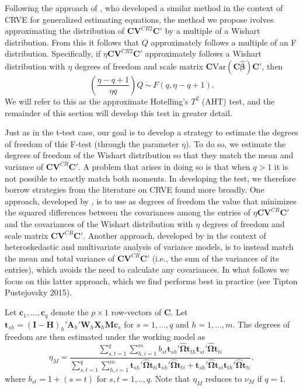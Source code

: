 \documentclass[12pt]{article}
\newcommand{\Var}{\text{Var}}
\newcommand{\bm}{\mathbf}
\newcommand{\bs}{\boldsymbol}
\begin{document}
Following the approach of \cite{Pan2002small}, who developed a similar method in the context of CRVE for generalized estimating equations, the method we propose ivolves approximating the distribution of $\bm{C}\bm{V}^{CR2} \bm{C}'$ by a multiple of a Wishart distribution. From this it follows that $Q$ approximately follows a multiple of an F distribution. Specifically, if $\eta \bm{C}\bm{V}^{CR2} \bm{C}'$ approximately follows a Wishart distribution with $\eta$ degrees of freedom and scale matrix $\bm{C} \Var\left(\bm{C}\bs{\hat\beta}\right)\bm{C}'$, then 
\begin{equation}
\label{eq:AHT}
\left(\frac{\eta - q + 1}{\eta q}\right) Q \ \dot\sim \ F(q, \eta - q + 1).
\end{equation}
We will refer to this as the approximate Hotelling's $T^2$ (AHT) test, and the remainder of this section will develop this test in greater detail.

Just as in the t-test case, our goal is to develop a strategy to estimate the degrees of freedom of this F-test (through the parameter $\eta$). 
To do so, we estimate the degrees of freedom of the Wishart distribution so that they match the mean and variance of $\bm{C}\bm{V}^{CR} \bm{C}'$. 
A problem that arises in doing so is that when $q > 1$ it is not possible to exactly match both moments. 
In developing the test, we therefore borrow strategies from the literature on CRVE found more broadly. 
One approach, developed by \cite{Pan2002small}, is to use as degrees of freedom the value that minimizes the squared differences between the covariances among the entries of $\eta \bm{C}\bm{V}^{CR}\bm{C}'$ and the covariances of the Wishart distribution with $\eta$ degrees of freedom and scale matrix $\bm{C}\bm{V}^{CR}\bm{C}'$. Another approach, developed by \citet{Zhang2012two-wayANOVA, Zhang2012MANOVA, Zhang2013tests} in the context of heteroskedastic and multivariate analysis of variance models, is to instead match the mean and total variance of $\bm{C}\bm{V}^{CR}\bm{C}'$ (i.e., the sum of the variances of its entries), which avoids the need to calculate any covariances. In what follows we focus on this latter approach, which we find performs best in practice (see Tipton Pustejovsky 2015).

Let $\bm{c}_1,...,\bm{c}_q$ denote the $p \times 1$ row-vectors of $\bm{C}$. 
Let $\bm{t}_{sh} = \left(\bm{I} - \bm{H}\right)_h'\bm{A}_h'\bm{W}_h\bm{X}_h\bm{M}\bm{c}_s$ for $s = 1,...,q$ and $h = 1,...,m$. 
The degrees of freedom are then estimated under the working model as
\begin{equation}
\label{eq:eta_model}
\eta_M = \frac{\sum_{s,t=1}^q \sum_{h,i=1}^m b_{st} \bm{t}_{sh}'\hat{\bs\Omega}\bm{t}_{th} \bm{t}_{si}'\hat{\bs\Omega}\bm{t}_{ti}}{\sum_{s,t=1}^q \sum_{h,i=1}^m \bm{t}_{sh}'\hat{\bs\Omega}\bm{t}_{ti} \bm{t}_{sh}'\hat{\bs\Omega}\bm{t}_{ti} + \bm{t}_{sh}'\hat{\bs\Omega}\bm{t}_{si} \bm{t}_{th}'\hat{\bs\Omega}\bm{t}_{ti}},
\end{equation}
where $b_{st} = 1 + (s=t)$ for $s,t=1,..,q$.
Note that $\eta_M$ reduces to $\nu_M$ if $q = 1$.
\end{document}
